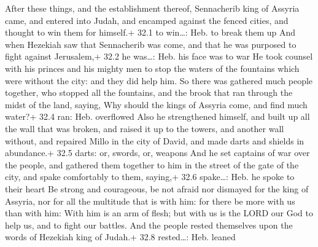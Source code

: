 After these things, and the establishment thereof,
Sennacherib king of Assyria came, and entered into Judah, and encamped
against the fenced cities, and thought to win them for himself.+ 32.1 to
win\ldots: Heb. to break them up  And when Hezekiah saw that
Sennacherib was come, and that he was purposed to fight against
Jerusalem,+ 32.2 he was\ldots: Heb. his face was to war  He
took counsel with his princes and his mighty men to stop the waters of
the fountains which were without the city: and they did help him.
 So there was gathered much people together, who stopped all
the fountains, and the brook that ran through the midst of the land,
saying, Why should the kings of Assyria come, and find much water?+ 32.4
ran: Heb. overflowed  Also he strengthened himself, and
built up all the wall that was broken, and raised it up to the towers,
and another wall without, and repaired Millo in the city of David, and
made darts and shields in abundance.+ 32.5 darts: or, swords, or,
weapons  And he set captains of war over the people, and
gathered them together to him in the street of the gate of the city, and
spake comfortably to them, saying,+ 32.6 spake\ldots: Heb. he spoke to
their heart  Be strong and courageous, be not afraid nor
dismayed for the king of Assyria, nor for all the multitude that is with
him: for there be more with us than with him:  With him is
an arm of flesh; but with us is the LORD our God to help us, and to
fight our battles. And the people rested themselves upon the words of
Hezekiah king of Judah.+ 32.8 rested\ldots: Heb. leaned

